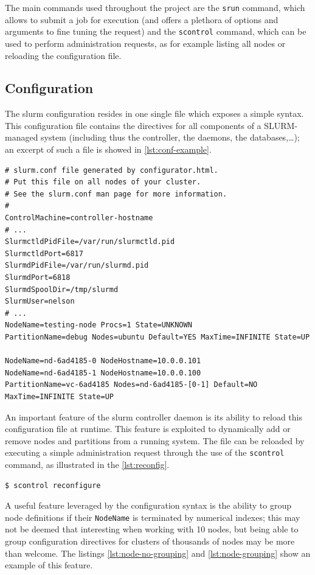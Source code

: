 The main commands used throughout the project are the \texttt{srun} command, which allows to submit a job for execution (and offers a plethora of options and arguments to fine tuning the request) and the \texttt{scontrol} command, which can be used to perform administration requests, as for example listing all nodes or reloading the configuration file.


\subsection{Configuration}

The \gls{slurm} configuration resides in one single file which exposes a simple syntax. This configuration file contains the directives for all components of a SLURM-managed system (including thus the controller, the daemons, the databases,…); an excerpt of such a file is showed in \autoref{lst:conf-example}.

\lstset{language=bash,caption=Configuration excerpt,label=lst:conf-example}
\begin{lstlisting}
# slurm.conf file generated by configurator.html.
# Put this file on all nodes of your cluster.
# See the slurm.conf man page for more information.
#
ControlMachine=controller-hostname
# ...
SlurmctldPidFile=/var/run/slurmctld.pid
SlurmctldPort=6817
SlurmdPidFile=/var/run/slurmd.pid
SlurmdPort=6818
SlurmdSpoolDir=/tmp/slurmd
SlurmUser=nelson
# ...
NodeName=testing-node Procs=1 State=UNKNOWN
PartitionName=debug Nodes=ubuntu Default=YES MaxTime=INFINITE State=UP

NodeName=nd-6ad4185-0 NodeHostname=10.0.0.101
NodeName=nd-6ad4185-1 NodeHostname=10.0.0.100
PartitionName=vc-6ad4185 Nodes=nd-6ad4185-[0-1] Default=NO MaxTime=INFINITE State=UP
\end{lstlisting}

An important feature of the \gls{slurm} controller daemon is its ability to reload this configuration file at runtime. This feature is exploited to dynamically add or remove nodes and partitions from a running system. The file can be reloaded by executing a simple administration request through the use of the \texttt{scontrol} command, as illustrated in the \autoref{lst:reconfig}.

\lstset{language=bash,caption=Reconfiguration command,label=lst:reconfig}
\begin{lstlisting}
$ scontrol reconfigure
\end{lstlisting}

A useful feature leveraged by the configuration syntax is the ability to group node definitions if their \texttt{NodeName} is terminated by numerical indexes; this may not be deemed that interesting when working with 10 nodes, but being able to group configuration directives for clusters of thousands of nodes may be more than welcome. The listings \ref{lst:node-no-grouping} and \ref{lst:node-grouping} show an example of this feature.


